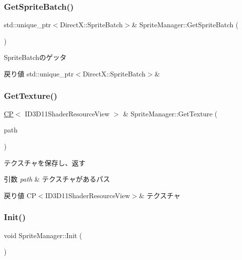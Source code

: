 \subsubsection{\texorpdfstring{Get\+Sprite\+Batch()}{GetSpriteBatch()}}
{\footnotesize\ttfamily std\+::unique\+\_\+ptr$<$Direct\+X\+::\+Sprite\+Batch$>$\& Sprite\+Manager\+::\+Get\+Sprite\+Batch (\begin{DoxyParamCaption}{ }\end{DoxyParamCaption})\hspace{0.3cm}{\ttfamily [inline]}}



Sprite\+Batchのゲッタ 

\begin{DoxyReturn}{戻り値}
std\+::unique\+\_\+ptr$<$\+Direct\+X\+::\+Sprite\+Batch$>$\& 
\end{DoxyReturn}
\mbox{\label{class_sprite_manager_a64bcc473169d17c3912cff9efe224115}} 
\subsubsection{\texorpdfstring{Get\+Texture()}{GetTexture()}}
{\footnotesize\ttfamily \mbox{\hyperlink{sprite__manager_8h_ab0deadee9fd38132a17560766af7fc45}{CP}}$<$ I\+D3\+D11\+Shader\+Resource\+View $>$ \& Sprite\+Manager\+::\+Get\+Texture (\begin{DoxyParamCaption}\item[{W\+C\+H\+AR $\ast$}]{path }\end{DoxyParamCaption})}



テクスチャを保存し、返す 


\begin{DoxyParams}{引数}
{\em path} & テクスチャがあるパス \\
\hline
\end{DoxyParams}
\begin{DoxyReturn}{戻り値}
C\+P$<$\+I\+D3\+D11\+Shader\+Resource\+View$>$\& テクスチャ 
\end{DoxyReturn}
\mbox{\label{class_sprite_manager_a82941ce284548c762f250220ea58f43c}} 
\subsubsection{\texorpdfstring{Init()}{Init()}}
{\footnotesize\ttfamily void Sprite\+Manager\+::\+Init (\begin{DoxyParamCaption}{ }\end{DoxyParamCaption})}



